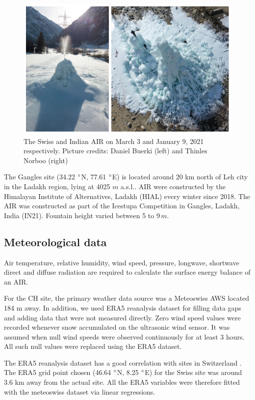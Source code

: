 \documentclass[utf8]{frontiersSCNS} %
\begin{document}
\begin{figure}
	\begin{center}
		\includegraphics[width=12 cm]{Figures/2AIR.jpg}
	\end{center}
	\caption{The Swiss and Indian AIR on March 3 and January 9, 2021 respectively. Picture credits: Daniel Buerki (left)
		and Thinles Norboo (right)}
	\label{fig:CHsite}
\end{figure}

The Gangles site (34.22 $\degree$N, 77.61 $\degree$E) is located around 20 km north of Leh city in the Ladakh region,
lying at 4025 $m$ a.s.l.. AIR were constructed by the Himalayan Institute of Alternatives, Ladakh (HIAL) every winter
since 2018. The AIR was constructed as part of the Icestupa Competition in Gangles, Ladakh, India (IN21). Fountain
height varied between 5 to 9\,$m$.

\subsection{Meteorological data}
Air temperature, relative humidity, wind speed, pressure, longwave, shortwave direct and diffuse radiation are required
to calculate the surface energy balance of an AIR.

For the CH site, the primary weather data source was a Meteoswiss AWS located 184 m away. In addition, we used ERA5
reanalysis dataset \citep{era5} for filling data gaps and adding data that were not measured directly. Zero wind speed
values were recorded whenever snow accumulated on the ultrasonic wind sensor. It was assumed when null wind speeds were
observed continuously for at least 3 hours. All such null values were replaced using the ERA5 dataset.

The ERA5 reanalysis dataset has a good correlation with sites in Switzerland \citep{Scherrer_2020}. The ERA5 grid point
chosen (46.64 $\degree$N, 8.25 $\degree$E) for the Swiss site was around 3.6 km away from the actual site.  All the ERA5
variables were therefore fitted with the meteoswiss dataset via linear regressions.
\end{document}
